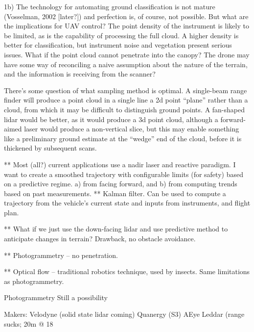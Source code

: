 \documentclass[10pt,a4paper]{report}
\begin{document}
1b) The technology for automating ground classification is not mature (Vosselman, 2002 [later?]) and perfection is, of course, not possible. But what are the implications for UAV control? The point density of the instrument is likely to be limited, as is the capability of processing the full cloud. A higher density is better for classification, but instrument noise and vegetation present serious issues. What if the point cloud cannot penetrate into the canopy? The drone may have some way of reconciling a naive assumption about the nature of the terrain, and the information is receiving from the scanner?

There’s some question of what sampling method is optimal. A single-beam range finder will produce a point cloud in a single line a 2d point “plane” rather than a cloud, from which it may be difficult to distinguish ground points. A fan-shaped lidar would be better, as it would produce a 3d point cloud, although a forward-aimed laser would produce a non-vertical slice, but this may enable something like a preliminary ground estimate at the “wedge” end of the cloud, before it is thickened by subsequent scans.

** Most (all?) current applications use a nadir laser and reactive paradigm. I want to create a smoothed trajectory with configurable limits (for safety) based on a predictive regime. a) from facing forward, and b) from computing trends based on past measurements.
** Kalman filter. Can be used to compute a trajectory from the vehicle’s current state and inputs from instruments, and flight plan. 

** What if we just use the down-facing lidar and use predictive method to anticipate changes in terrain? Drawback, no obstacle avoidance.

** Photogrammetry -- no penetration.

** Optical flow -- traditional robotics technique, used by insects. Same limitations as photogrammetry.

Photogrammetry
Still a possibility

Makers:
Velodyne (solid state lidar coming)
Quanergy (S3)
AEye
Leddar (range sucks; 20m @ 18%



\end{document}
